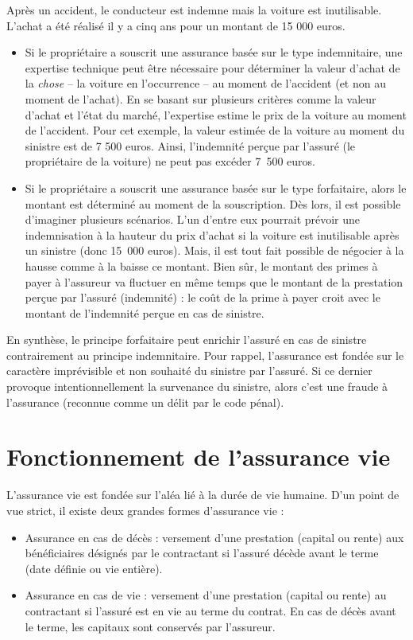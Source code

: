 \documentclass{article}
\newcommand{\blackFrame}[2]{
    \begin{tcolorbox}[colback=white,colframe=black!100!white,title={#1}]
        #2
    \end{tcolorbox}
}
\begin{document}
\blackFrame{Exemple}{
Après un accident, le conducteur est indemne mais la voiture est inutilisable. L'achat a été réalisé il y a cinq ans pour un montant de 15 000 euros.
\begin{itemize}
    \item Si le propriétaire a souscrit une assurance basée sur le type indemnitaire, une expertise technique peut être nécessaire pour déterminer la valeur d'achat de la \textit{chose} -- la voiture en l'occurrence -- au moment de l'accident (et non au moment de l'achat). En se basant sur plusieurs critères comme la valeur d'achat et l'état du marché, l'expertise estime le prix de la voiture au moment de l'accident. Pour cet exemple, la valeur estimée de la voiture au moment du sinistre est de 7 500 euros. Ainsi, l'indemnité perçue par l'assuré (le propriétaire de la voiture) ne peut pas excéder 7~500 euros.
    \item Si le propriétaire a souscrit une assurance basée sur le type forfaitaire, alors le montant est déterminé au moment de la souscription. Dès lors, il est possible d'imaginer plusieurs scénarios. L'un d'entre eux pourrait prévoir une indemnisation à la hauteur du prix d'achat si la voiture est inutilisable après un sinistre (donc 15~000 euros). Mais, il est tout fait possible de négocier à la hausse comme à la baisse ce montant. Bien sûr, le montant des primes à payer à l'assureur va fluctuer en même temps que le montant de la prestation perçue par l'assuré (indemnité) : le coût de la prime à payer croit avec le montant de l'indemnité perçue en cas de sinistre.
\end{itemize}
En synthèse, le principe forfaitaire peut enrichir l'assuré en cas de sinistre contrairement au principe indemnitaire. Pour rappel, l'assurance est fondée sur le caractère imprévisible et non souhaité du sinistre par l'assuré. Si ce dernier provoque intentionnellement la survenance du sinistre, alors c'est une fraude à l'assurance (reconnue comme un délit par le code pénal).
}

\newpage

\section{Fonctionnement de l'assurance vie}
L'assurance vie est fondée sur l'aléa lié à la durée de vie humaine. D'un point de vue strict, il existe deux grandes formes d'assurance vie :
\begin{itemize}
    \item Assurance en cas de décès : versement d'une prestation (capital ou rente) aux bénéficiaires désignés par le contractant si l'assuré décède avant le terme (date définie ou vie entière).
    \item Assurance en cas de vie : versement d'une prestation (capital ou rente) au contractant si l'assuré est en vie au terme du contrat. En cas de décès avant le terme, les capitaux sont conservés par l'assureur.
\end{itemize}
\end{document}
